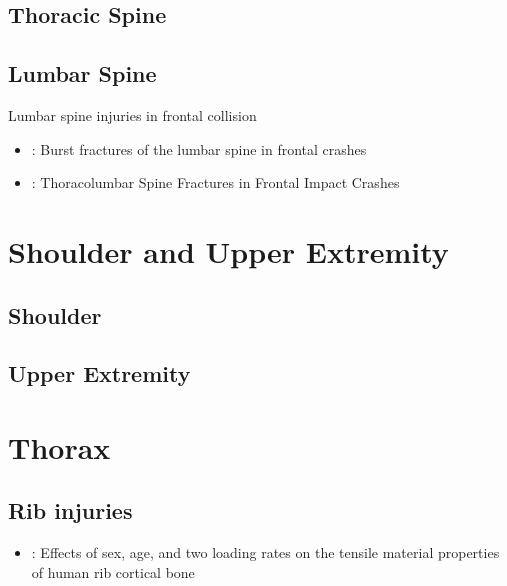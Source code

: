 \documentclass[]{book}
\providecommand{\tightlist}{%
  \setlength{\itemsep}{0pt}\setlength{\parskip}{0pt}}
\begin{document}
\hypertarget{thoracic-spine}{%
\section{Thoracic Spine}\label{thoracic-spine}}

\hypertarget{lumbar-spine}{%
\section{Lumbar Spine}\label{lumbar-spine}}

Lumbar spine injuries in frontal collision

\begin{itemize}
\item
  \citet{Kaufman2013}: Burst fractures of the lumbar spine in frontal crashes
\item
  \citet{Pintar2012}: Thoracolumbar Spine Fractures in Frontal Impact Crashes
\end{itemize}

\hypertarget{shoulder-and-upper-extremity}{%
\chapter{Shoulder and Upper Extremity}\label{shoulder-and-upper-extremity}}

\hypertarget{shoulder}{%
\section{Shoulder}\label{shoulder}}

\hypertarget{upper-extremity}{%
\section{Upper Extremity}\label{upper-extremity}}

\hypertarget{thorax}{%
\chapter{Thorax}\label{thorax}}

\hypertarget{rib-injuries}{%
\section{Rib injuries}\label{rib-injuries}}

\begin{itemize}
\tightlist
\item
  \citet{Katzenberger2020}: Effects of sex, age, and two loading rates on the tensile material properties of human rib cortical bone
\end{itemize}
\end{document}
